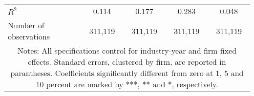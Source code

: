 \begin{tabular}{lcccc}
\\
	$R^2$ 
				& 0.114 
				& 0.177 
				& 0.283 
				& 0.048 \\
	Number of observations 
				& 311,119 
				& 311,119 
				& 311,119 
				& 311,119 \\
\hline \hline
\multicolumn{ 5 }{c}{\begin{minipage}{\textwidth}
\small Notes: All specifications control for industry-year and firm fixed effects. Standard errors, clustered by firm, are reported in parantheses. Coefficients significantly different from zero at 1, 5 and 10 percent are marked by ***, ** and *, respectively.

  \end{minipage} } \\
\end{tabular}